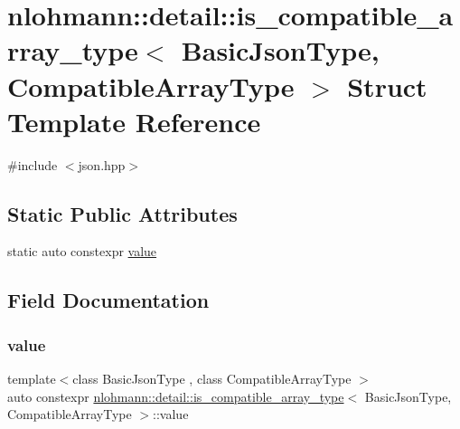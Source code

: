 \hypertarget{structnlohmann_1_1detail_1_1is__compatible__array__type}{}\section{nlohmann\+::detail\+::is\+\_\+compatible\+\_\+array\+\_\+type$<$ Basic\+Json\+Type, Compatible\+Array\+Type $>$ Struct Template Reference}
\label{structnlohmann_1_1detail_1_1is__compatible__array__type}


{\ttfamily \#include $<$json.\+hpp$>$}

\subsection*{Static Public Attributes}
\begin{DoxyCompactItemize}
\item 
static auto constexpr \mbox{\hyperlink{structnlohmann_1_1detail_1_1is__compatible__array__type_a01bc2274c22746bbb2cefd2acee8b572}{value}}
\end{DoxyCompactItemize}


\subsection{Field Documentation}
\mbox{\label{structnlohmann_1_1detail_1_1is__compatible__array__type_a01bc2274c22746bbb2cefd2acee8b572}} 
\subsubsection{\texorpdfstring{value}{value}}
{\footnotesize\ttfamily template$<$class Basic\+Json\+Type , class Compatible\+Array\+Type $>$ \\
auto constexpr \mbox{\hyperlink{structnlohmann_1_1detail_1_1is__compatible__array__type}{nlohmann\+::detail\+::is\+\_\+compatible\+\_\+array\+\_\+type}}$<$ Basic\+Json\+Type, Compatible\+Array\+Type $>$\+::value\hspace{0.3cm}{\ttfamily [static]}}

